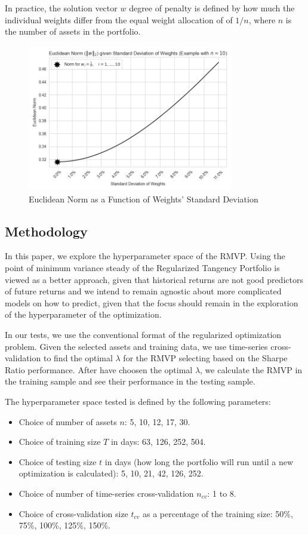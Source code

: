 \documentclass{article}
\begin{document}
In practice, the solution vector $w$ degree of penalty is defined by how much the individual weights differ from the equal weight allocation of of $1/n$, where $n$ is the number of assets in the portfolio.

\begin{figure}[h]
    \centering
    \includegraphics[width=0.8\textwidth]{graphics/illustrations/euclidean_norm.png}
    \caption{Euclidean Norm as a Function of Weights' Standard Deviation}
    \label{fig:euclidean_norm}
\end{figure}

\subsection{Methodology}
In this paper, we explore the hyperparameter space of the RMVP. Using the point of minimum variance steady of the Regularized Tangency Portfolio is viewed as a better approach, given that historical returns are not good predictors of future returns and we intend to remain agnostic about more complicated models on how to predict, given that the focus should remain in the exploration of the hyperparameter of the optimization.

In our tests, we use the conventional format of the regularized optimization problem. Given the selected assets and training data, we use time-series cross-validation to find the optimal $\lambda$ for the RMVP selecting based on the Sharpe Ratio performance. After have choosen the optimal $\lambda$, we calculate the RMVP in the training sample and see their performance in the testing sample.

The hyperparameter space tested is defined by the following parameters:
\begin{itemize}
    \item Choice of number of assets $n$: 5, 10, 12, 17, 30.
    \item Choice of training size $T$ in days: 63, 126, 252, 504.
    \item Choice of testing size $t$ in days (how long the portfolio will run until a new optimization is calculated): 5, 10, 21, 42, 126, 252.
    \item Choice of number of time-series cross-validation $n_{cv}$: 1 to 8.
    \item Choice of cross-validation size $t_{cv}$ as a percentage of the training size: 50\%, 75\%, 100\%, 125\%, 150\%.
\end{itemize}
\end{document}
